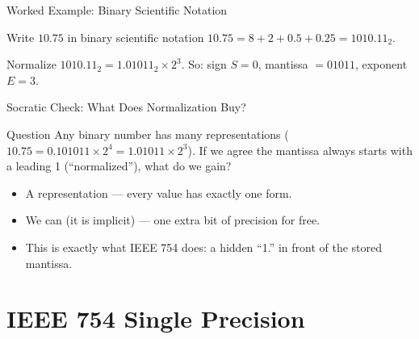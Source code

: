 \documentclass[aspectratio=169]{beamer}
\begin{document}
\begin{frame}{Worked Example: Binary Scientific Notation}
  \begin{block}{Write $10.75$ in binary scientific notation}
    $10.75 = 8 + 2 + 0.5 + 0.25 = 1010.11_2$.
  \end{block}
  \begin{exampleblock}{Normalize}
    $1010.11_2 = 1.01011_2 \times 2^3$. So: sign $S=0$, mantissa $= 01011$,
    exponent $E = 3$.
  \end{exampleblock}
  \vspace{0.2cm}
\end{frame}

\begin{frame}{Socratic Check: What Does Normalization Buy?}
  \begin{alertblock}{Question}
    Any binary number has many representations ($10.75 = 0.101011 \times 2^4 =
    1.01011 \times 2^3$). If we agree the mantissa always starts with a
    leading 1 (``normalized''), what do we gain?
  \end{alertblock}
  \begin{itemize}
    \item A  representation --- every value has exactly one form.
    \item We can  (it is implicit) --- one extra bit of
      precision for free.
    \item This is exactly what IEEE 754 does: a hidden ``1.'' in front of the
      stored mantissa.
  \end{itemize}
\end{frame}


\section{IEEE 754 Single Precision}
\end{document}
